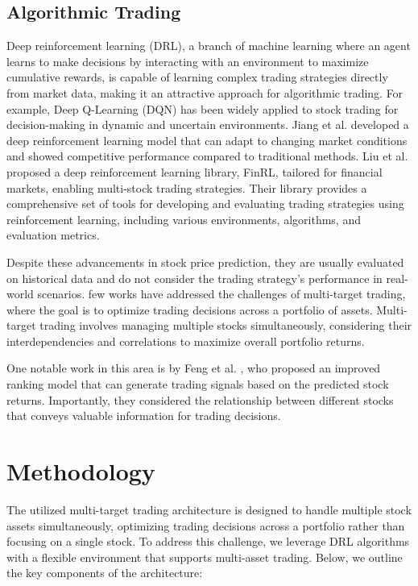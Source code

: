 \documentclass[conference]{IEEEtran}
\begin{document}
\subsection{Algorithmic Trading}

Deep reinforcement learning (DRL), a branch of machine learning where an agent learns to make decisions by interacting with an environment to maximize cumulative rewards, is capable of learning complex trading strategies directly from market data, making it an attractive approach for algorithmic trading. For example, Deep Q-Learning (DQN) has been widely applied to stock trading for decision-making in dynamic and uncertain environments. Jiang et al. \cite{jiang2017} developed a deep reinforcement learning model that can adapt to changing market conditions and showed competitive performance compared to traditional methods. Liu et al. \cite{liu2022finrl} proposed a deep reinforcement learning library, FinRL, tailored for financial markets, enabling multi-stock trading strategies. Their library provides a comprehensive set of tools for developing and evaluating trading strategies using reinforcement learning, including various environments, algorithms, and evaluation metrics.

Despite these advancements in stock price prediction, they are usually evaluated on historical data and do not consider the trading strategy's performance in real-world scenarios. few works have addressed the challenges of multi-target trading, where the goal is to optimize trading decisions across a portfolio of assets. Multi-target trading involves managing multiple stocks simultaneously, considering their interdependencies and correlations to maximize overall portfolio returns.

One notable work in this area is by Feng et al. \cite{feng2019rank}, who proposed an improved ranking model that can generate trading signals based on the predicted stock returns. Importantly, they considered the relationship between different stocks that conveys valuable information for trading decisions.

\section{Methodology}

The utilized multi-target trading architecture is designed to handle multiple stock assets simultaneously, optimizing trading decisions across a portfolio rather than focusing on a single stock. To address this challenge, we leverage DRL algorithms with a flexible environment that supports multi-asset trading. Below, we outline the key components of the architecture:
\end{document}

